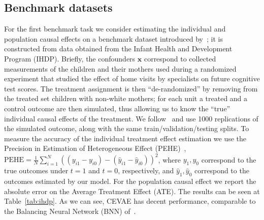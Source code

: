 \documentclass{article}
\def\*#1{\mathbf{#1}}
\begin{document}
\subsection{Benchmark datasets}
For the first benchmark task we consider estimating the individual and population causal effects on a benchmark dataset introduced by~\cite{hill2011bayesian}; it is constructed from data obtained from the Infant Health and Development Program (IHDP). Briefly, the confounders $\*x$ correspond to collected measurements of the children and their mothers used during a randomized experiment that studied the effect of home visits by specialists on future cognitive test scores. The treatment assignment is then ``de-randomized'' by removing from the treated set children with non-white mothers; for each unit a treated and a control outcome are then simulated, thus allowing us to know the ``true'' individual causal effects of the treatment. 
We follow~\cite{johansson2016learning,shalit2016estimating} and use 1000 replications of the simulated outcome, along with the same train/validation/testing splits. To measure the accuracy of the individual treatment effect estimation we use the Precision in Estimation of Heterogeneous Effect (PEHE)~\citep{hill2011bayesian}, $\text{PEHE} = \frac{1}{N}\sum_{i=1}^{N}((y_{i1} - y_{i0}) - (\hat{y}_{i1} - \hat{y}_{i0}))^2$, where $y_1, y_0$ correspond to the true outcomes under $t=1$ and $t=0$, respectively, and $\hat{y}_1, \hat{y}_0$ correspond to the outcomes estimated by our model. For the population causal effect we report the absolute error on the Average Treatment Effect (ATE). The results can be seen at Table~\ref{tab:ihdp}. As we can see, CEVAE has decent performance, comparable to the Balancing Neural Network (BNN) of~\cite{johansson2016learning}. 
\end{document}
